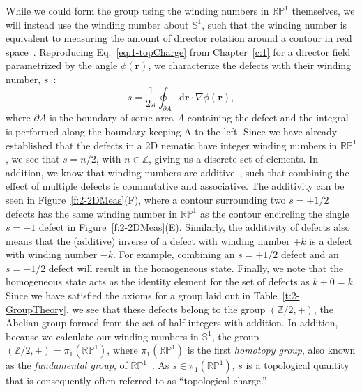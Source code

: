 While we could form the group using the winding numbers in $\mathbb{R}\mathbb{P}^1$ themselves, we will instead use the winding number about $\mathbb{S}^1$, such that the winding number is equivalent to measuring the amount of director rotation around a contour in real space~\cite{RN23,RN153,RN203}.
Reproducing Eq.~\ref{eq:1-topCharge} from Chapter~\ref{c:1} for a director field parametrized by the angle $\phi(\mathbf{r})$, we characterize the defects with their winding number, $s$~\cite{RN153,RN236}:
\begin{equation}
  s = \frac{1}{2 \pi}\oint_{\partial A} \textrm{d}\mathbf{r} \cdot \nabla\phi(\mathbf{r}),\label{eq:2-topCharge}
\end{equation}
where $\partial A$ is the boundary of some area $A$ containing the defect and the integral is performed along the boundary keeping A to the left.
Since we have already established that the defects in a 2D nematic have integer winding numbers in $\mathbb{R}\mathbb{P}^1$, we see that $s = n/2$, with $n \in \mathbb{Z}$, giving us a discrete set of elements.
In addition, we know that winding numbers are additive~\cite{RN196}, such that combining the effect of multiple defects is commutative and associative.
The additivity can be seen in Figure~\ref{f:2-2DMeas}(F), where a contour surrounding two $s = +1/2$ defects has the same winding number in $\mathbb{R}\mathbb{P}^1$ as the contour encircling the single $s = +1$ defect in Figure~\ref{f:2-2DMeas}(E).
Similarly, the additivity of defects also means that the (additive) inverse of a defect with winding number $+k$ is a defect with winding number $-k$.
For example, combining an $s = +1/2$ defect and an $s = -1/2$ defect will result in the homogeneous state.
Finally, we note that the homogeneous state acts as the identity element for the set of defects as $k + 0 = k$.
Since we have satisfied the axioms for a group laid out in Table~\ref{t:2-GroupTheory}, we see that these defects belong to the group $(\mathbb{Z}/2, +)$, the Abelian group formed from the set of half-integers with addition.
In addition, because we calculate our winding numbers in $\mathbb{S}^1$, the group $(\mathbb{Z}/2, +) = \pi_1 (\mathbb{R}\mathbb{P}^1)$, where $\pi_1 (\mathbb{R}\mathbb{P}^1)$ is the first \emph{homotopy group}, also known as the \emph{fundamental group}, of $\mathbb{R}\mathbb{P}^1$~\cite{RN196,RN153,RN236}.
As $s \in \pi_1(\mathbb{R}\mathbb{P}^1)$, $s$ is a topological quantity that is consequently often referred to as ``topological charge.''
